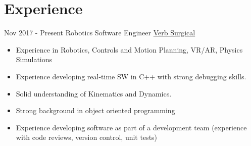 \documentclass[letterpaper]{twentysecondcv} %
\begin{document}
\makeprofile %


\section{Experience}

\begin{twenty} %
	\twentyitem
	{Nov 2017 -}
	{Present}
	{Robotics Software Engineer}
	{\href{http://verbsurgical.com/}{Verb Surgical}}
	{}
	{\begin{itemize}
			\item Experience in Robotics, Controls and Motion Planning, VR/AR, Physics Simulations
			
			\item Experience developing real-time SW in C++ with strong debugging skills.
			
			\item Solid understanding of Kinematics and Dynamics.
			
			\item Strong background in object oriented programming
			
			\item Experience developing software as part of a development team (experience with code reviews, version control, unit tests)
			

\end{itemize}}
\end{twenty}
\end{document}
